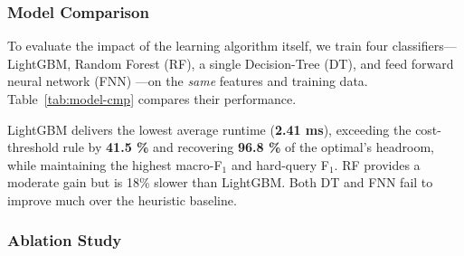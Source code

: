 \documentclass[sigconf, nonacm]{acmart}
\begin{document}
\begin{table}[t]
  \centering
  \small
  \setlength{\tabcolsep}{3.5pt}
  \caption{Comparison among Different AI Models}
  \label{tab:model-cmp}
  \vspace{-1em}
\end{table}


\subsubsection{Model Comparison}
\label{ssec:model-cmp}
To evaluate the impact of the learning algorithm itself, we train four
classifiers—LightGBM, Random Forest (RF), a single Decision-Tree
(DT), and feed forward neural network (FNN) —on the \emph{same} features and
training data.  
Table~\ref{tab:model-cmp} compares their performance.

LightGBM delivers the lowest average runtime (\textbf{2.41 ms}),
exceeding the cost-threshold rule by \textbf{41.5 \%} and recovering
\textbf{96.8 \%} of the optimal’s headroom, while maintaining the highest
macro-F\(_1\) and hard-query F\(_1\).  
RF provides a moderate gain but is 18\% slower than LightGBM.
Both DT and FNN fail to improve much over the heuristic baseline.


\subsubsection{Ablation Study}
\label{sec:ablation}
\end{document}
